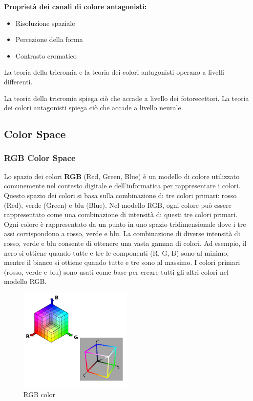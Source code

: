 \textbf{Proprietà dei canali di colore antagonisti:}
\begin{itemize}
  \item Risoluzione spaziale
  \item Percezione della forma
  \item Contrasto cromatico
\end{itemize}

La teoria della tricromia e la teoria dei colori antagonisti operano a livelli differenti.

La teoria della tricromia spiega ciò che accade a livello dei fotorecettori.
La teoria dei colori antagonisti spiega ciò che accade a livello neurale.
\subsection{Color Space}
\subsubsection{RGB Color Space}

Lo spazio dei colori \textbf{RGB} (Red, Green, Blue) è un modello di colore utilizzato comunemente nel contesto digitale e dell'informatica per rappresentare i colori. Questo spazio dei colori si basa sulla combinazione di tre colori primari: rosso (Red), verde (Green) e blu (Blue).
Nel modello RGB, ogni colore può essere rappresentato come una combinazione di intensità di questi tre colori primari. Ogni colore è rappresentato da un punto in uno spazio tridimensionale dove i tre assi corrispondono a rosso, verde e blu.
La combinazione di diverse intensità di rosso, verde e blu consente di ottenere una vasta gamma di colori. Ad esempio, il nero si ottiene quando tutte e tre le componenti (R, G, B) sono al minimo, mentre il bianco si ottiene quando tutte e tre
 sono al massimo. I colori primari (rosso, verde e blu) sono usati come base per creare tutti gli altri colori nel modello RGB.
\begin{figure}[H]
    \centering
    \includegraphics[width=0.5\textwidth]{images/RGBCOlor.png} 
    \caption{RGB color}
    \label{fig:immagine}
\end{figure}
